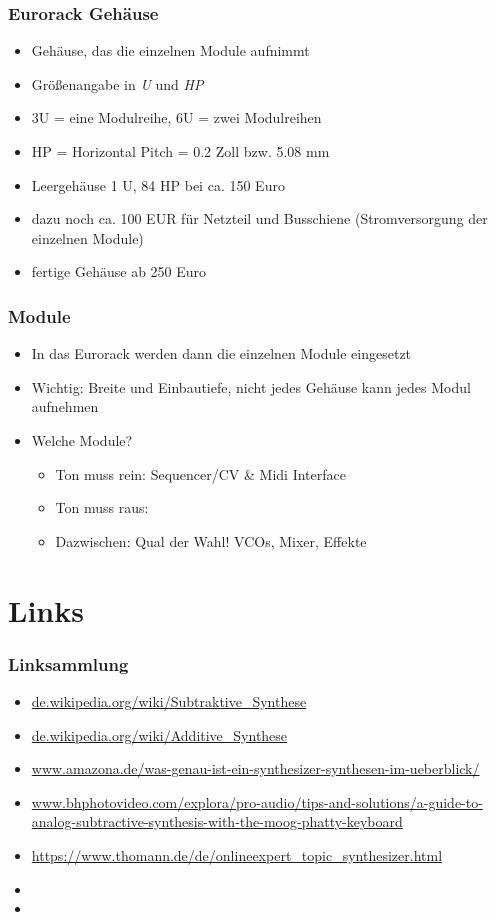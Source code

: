 \documentclass[11pt,ngerman]{beamer}
\begin{document}
\begin{frame}
\frametitle{Eurorack Gehäuse}

\begin{itemize}
\item Gehäuse, das die einzelnen Module aufnimmt
\item Größenangabe in \textit{U} und \textit{HP}
\item 3U = eine Modulreihe, 6U = zwei Modulreihen
\item HP = Horizontal Pitch = 0.2 Zoll bzw. 5.08 mm
\item Leergehäuse 1 U, 84 HP bei ca. 150 Euro
\item dazu noch ca. 100 EUR für Netzteil und Busschiene (Stromversorgung der einzelnen Module)
\item fertige Gehäuse ab 250 Euro
\end{itemize}
\end{frame}

\begin{frame}
\frametitle{Module}

\begin{itemize}
\item In das Eurorack werden dann die einzelnen Module eingesetzt
\item Wichtig: Breite und Einbautiefe, nicht jedes Gehäuse kann jedes Modul aufnehmen
\item Welche Module? 
\begin{itemize}
	\item Ton muss rein: Sequencer/CV \& Midi Interface
	\item Ton muss raus:
	\item Dazwischen: Qual der Wahl! VCOs, Mixer, Effekte
\end{itemize}
\end{itemize}
\end{frame}

 
\section{Links} 
 
\begin{frame}[allowframebreaks]
\frametitle{Linksammlung}


\begin{itemize}
\item \url{de.wikipedia.org/wiki/Subtraktive_Synthese}
\item \url{de.wikipedia.org/wiki/Additive_Synthese}
\item \url{www.amazona.de/was-genau-ist-ein-synthesizer-synthesen-im-ueberblick/}
\item \url{www.bhphotovideo.com/explora/pro-audio/tips-and-solutions/a-guide-to-analog-subtractive-synthesis-with-the-moog-phatty-keyboard}
\item \url{https://www.thomann.de/de/onlineexpert_topic_synthesizer.html}
\item 
\item 
\end{itemize}
\end{frame} 
 
 
 
\end{document}
